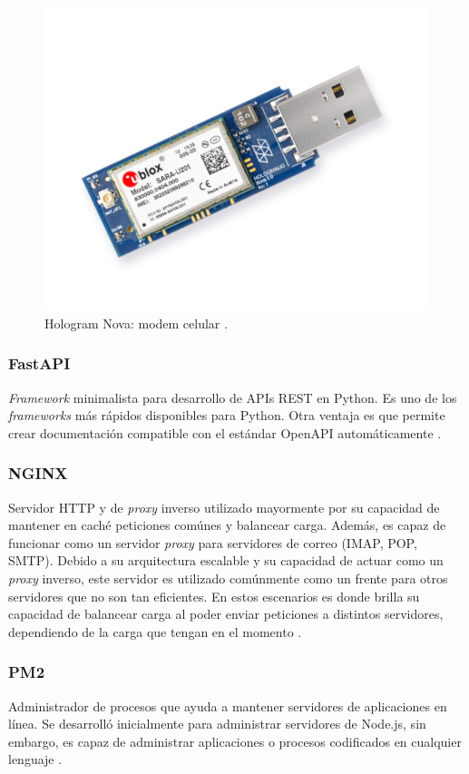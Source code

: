 \begin{figure}[!ht]
    \centering
    \includegraphics[width=.50\linewidth]{imagenes/hologram_nova_usb.png}
    \caption{Hologram Nova: modem celular \cite{hologram_nova}.}
    \label{fig:hologram_nova}
\end{figure}

\subsubsection{FastAPI}
\textit{Framework} minimalista para desarrollo de APIs REST en Python. Es uno de los \textit{frameworks} más rápidos disponibles para Python. Otra ventaja es que permite crear documentación compatible con el estándar OpenAPI automáticamente \cite{fastapi}.

\subsubsection{NGINX}
Servidor HTTP y de \textit{proxy} inverso utilizado mayormente por su capacidad de mantener en caché peticiones comúnes y balancear carga. Además, es capaz de funcionar como un servidor \textit{proxy} para servidores de correo (IMAP, POP, SMTP). Debido a su arquitectura escalable y su capacidad de actuar como un \textit{proxy} inverso, este servidor es utilizado comúnmente como un frente para otros servidores que no son tan eficientes. En estos escenarios es donde brilla su capacidad de balancear carga al poder enviar peticiones a distintos servidores, dependiendo de la carga que tengan en el momento \cite{nginx}.

\subsubsection{PM2}
Administrador de procesos que ayuda a mantener servidores de aplicaciones en línea. Se desarrolló inicialmente para administrar servidores de Node.js, sin embargo, es capaz de administrar aplicaciones o procesos codificados en cualquier lenguaje \cite{pm2_landing}.


